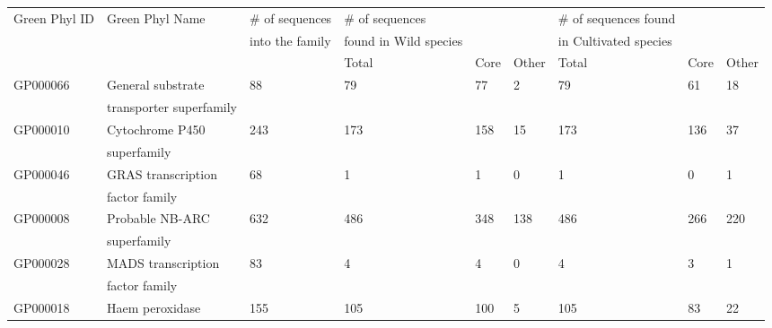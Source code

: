 \documentclass[10pt,letterpaper]{article}
\begin{document}
\begin{table}[]
\centering
\small
\begin{tabular}{lllllllll}
Green Phyl ID & Green Phyl Name                               & \# of sequences  & \# of sequences  &      &       & \# of sequences found  &      &       \\
              &                                               & into the family      & found in Wild species&      &       & in Cultivated species      &      &       \\
              &                                               &                                     & Total                                     & Core & Other & Total                                           & Core & Other \\
GP000066      & General substrate      & 88                                  & 79                                        & 77   & 2     & 79                                              & 61   & 18    \\
              & transporter superfamily & & & & & & & \\
GP000010      & Cytochrome P450                    & 243                                 & 173                                       & 158  & 15    & 173                                             & 136  & 37    \\
	      & superfamily & & & & & & & \\
GP000046      & GRAS transcription               & 68                                  & 1                                         & 1    & 0     & 1                                               & 0    & 1     \\
              & factor family & & & & & & & \\
GP000008      & Probable NB-ARC                    & 632                                 & 486                                       & 348  & 138   & 486                                             & 266  & 220   \\
              & superfamily & & & & & & & \\
GP000028      & MADS transcription               & 83                                  & 4                                         & 4    & 0     & 4                                               & 3    & 1     \\
              & factor family & & & & & & & \\
GP000018      & Haem peroxidase                    & 155                                 & 105                                       & 100  & 5     & 105                                             & 83   & 22    \\

\end{tabular}
\end{table}
\end{document}
